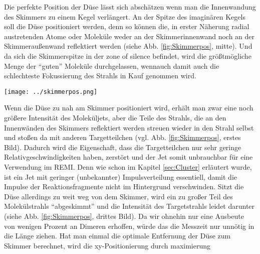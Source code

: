 Die perfekte Position der Düse lässt sich abschätzen wenn man die Innenwandung des Skimmers zu einem Kegel verlängert. An der Spitze des imaginären Kegels soll die Düse positioniert werden, denn so können die, in erster Näherung radial austretenden Atome oder Moleküle weder an der Skimmerinnenwand noch an der Skimmeraußenwand reflektiert werden (siehe Abb. \ref{fig:Skimmerpos}, mitte). Und da sich die Skimmerspitze in der zone of silence befindet, wird die größtmögliche Menge der \enquote{guten} Moleküle durchgelassen, wennauch damit auch die schlechteste Fokussierung des Strahls in Kauf genommen wird.
%
\begin{center}
\begin{minipage}{\linewidth}
\centering
\texttt{[image: ../skimmerpos.png]}%
 \label{fig:Skimmerpos}
\end{minipage} 
\end{center} 

Wenn die Düse zu nah am Skimmer positioniert wird, erhält man zwar eine noch größere Intensität des Moleküljets, aber die Teile des Strahls, die an den Innenwänden des Skimmers reflektiert werden streuen wieder in den Strahl selbst und stoßen da mit anderen Targetteilchen (vgl. Abb. \ref{fig:Skimmerpos}, erstes Bild). Dadurch wird die Eigenschaft, dass die Targetteilchen nur sehr geringe Relativgeschwindigkeiten haben, zerstört und der Jet somit unbrauchbar für eine Verwendung im REMI. Denn wie schon im Kapitel \ref{sec:Cluster} erläutert wurde, ist ein Jet mit geringer (unbekannter) Impulsverteilung essentiell, damit die Impulse der Reaktionsfragmente nicht im Hintergrund verschwinden. 
Sitzt die Düse allerdings zu weit weg von dem Skimmer, wird ein zu großer Teil des Molekülstrahls \enquote{abgeskimmt} und die Intensität des Targetstrahls leidet darunter (siehe Abb. \ref{fig:Skimmerpos}, drittes Bild). Da wir ohnehin nur eine Ausbeute von wenigen Prozent an Dimeren erhoffen, würde das die Messzeit nur unnötig in die Länge ziehen.
Hat man einmal die optimale Entfernung der Düse zum Skimmer berechnet, wird die xy-Positionierung durch maximierung



